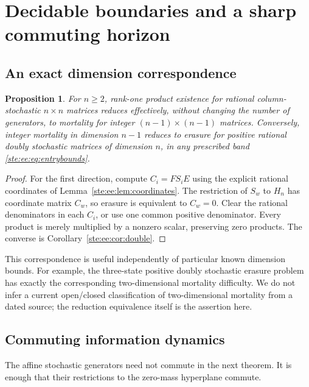 \documentclass[11pt,letterpaper]{article}
\newtheorem{proposition}[theorem]{Proposition}
\theoremstyle{definition}
\theoremstyle{remark}
\begin{document}
\section{Decidable boundaries and a sharp commuting horizon}
\label{ste:ee:sec:decidable}

\subsection{An exact dimension correspondence}

\begin{proposition}\label{ste:ee:prop:dimension}
For $n\geq2$, rank-one product existence for rational column-stochastic
$n\times n$ matrices reduces effectively, without changing the number of
generators, to mortality for integer $(n-1)\times(n-1)$ matrices. Conversely,
integer mortality in dimension $n-1$ reduces to erasure for positive rational
doubly stochastic matrices of dimension $n$, in any prescribed band
\eqref{ste:ee:eq:entrybounds}.
\end{proposition}
\begin{proof}
For the first direction, compute $C_i=FS_iE$ using the explicit rational
coordinates of Lemma~\ref{ste:ee:lem:coordinates}. The restriction of $S_w$ to $H_n$
has coordinate matrix $C_w$, so erasure is equivalent to $C_w=0$. Clear the
rational denominators in each $C_i$, or use one common positive denominator.
Every product is merely multiplied by a nonzero scalar, preserving zero
products. The converse is Corollary~\ref{ste:ee:cor:double}.
\end{proof}

This correspondence is useful independently of particular known dimension
bounds. For example, the three-state positive doubly stochastic erasure problem
has exactly the corresponding two-dimensional mortality difficulty. We do not
infer a current open/closed classification of two-dimensional mortality from a
dated source; the reduction equivalence itself is the assertion here.

\subsection{Commuting information dynamics}

The affine stochastic generators need not commute in the next theorem. It is
enough that their restrictions to the zero-mass hyperplane commute.
\end{document}
